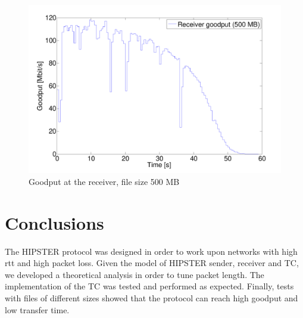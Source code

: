 \documentclass[10pt,twocolumn]{article}
\begin{document}
\begin{figure}[h]
  \centering
  \includegraphics[width = 0.95\columnwidth, keepaspectratio]{tex/images/goodput_c1_500.pdf}
  \caption{Goodput at the receiver, file size 500 MB}
  \label{fig:goodput_500}
\end{figure}

\section{Conclusions}
The HIPSTER protocol was designed in order to work upon networks with high rtt and high packet loss. Given the model of HIPSTER sender, receiver and TC, we developed a theoretical analysis in order to tune packet length. The implementation of the TC was tested and performed as expected. Finally, tests with files of different sizes showed that the protocol can reach high goodput and low transfer time.
\end{document}
